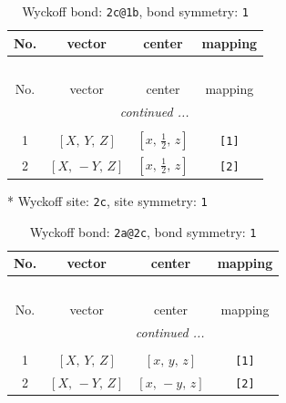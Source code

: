 \documentclass[fleqn,8pt]{jsarticle}
\begin{document}
\renewcommand{\arraystretch}{1.2}
\begin{longtable}{cccc}
\caption{Wyckoff bond: {\tt 2c@1b}, bond symmetry: {\tt 1}}
 \\
 \hline \hline
No. & vector & center & mapping \\ \hline \endfirsthead

\multicolumn{3}{l}{\tablename\ \thetable{}} \\
 \hline \hline
No. & vector & center & mapping \\ \hline \endhead

 \hline \hline
\multicolumn{3}{r}{\footnotesize\it continued ...} \\ \endfoot

 \hline \hline
\multicolumn{3}{r}{} \\ \endlastfoot

1 & $\left[ X,\, Y,\, Z \right]$ & $\left[ x,\, \frac{1}{2},\, z \right]$ & {\tt [1]} \\ \hline
2 & $\left[ X,\, - Y,\, Z \right]$ & $\left[ x,\, \frac{1}{2},\, z \right]$ & {\tt [2]} \\
\end{longtable}
* Wyckoff site: {\tt 2c}, site symmetry: {\tt 1}
\renewcommand{\arraystretch}{1.2}
\begin{longtable}{cccc}
\caption{Wyckoff bond: {\tt 2a@2c}, bond symmetry: {\tt 1}}
 \\
 \hline \hline
No. & vector & center & mapping \\ \hline \endfirsthead

\multicolumn{3}{l}{\tablename\ \thetable{}} \\
 \hline \hline
No. & vector & center & mapping \\ \hline \endhead

 \hline \hline
\multicolumn{3}{r}{\footnotesize\it continued ...} \\ \endfoot

 \hline \hline
\multicolumn{3}{r}{} \\ \endlastfoot

1 & $\left[ X,\, Y,\, Z \right]$ & $\left[ x,\, y,\, z \right]$ & {\tt [1]} \\ \hline
2 & $\left[ X,\, - Y,\, Z \right]$ & $\left[ x,\, - y,\, z \right]$ & {\tt [2]} \\
\end{longtable}
\end{document}
